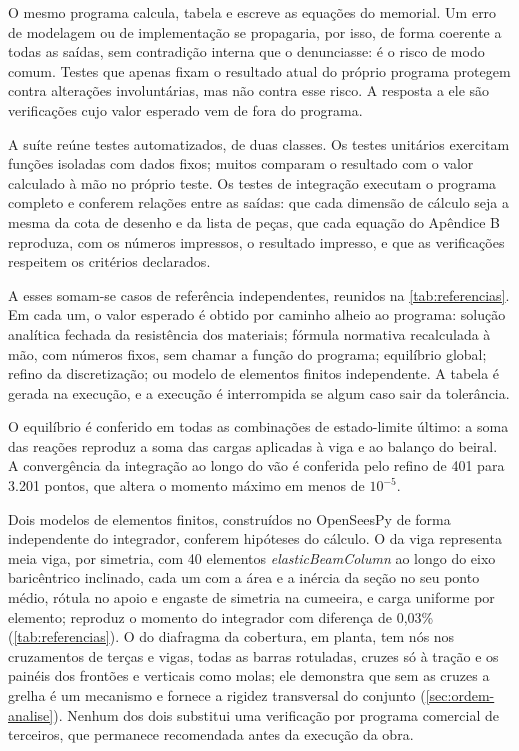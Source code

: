 O mesmo programa calcula, tabela e escreve as equações do memorial. Um erro de
modelagem ou de implementação se propagaria, por isso, de forma coerente a todas
as saídas, sem contradição interna que o denunciasse: é o risco de modo comum.
Testes que apenas fixam o resultado atual do próprio programa protegem contra
alterações involuntárias, mas não contra esse risco. A resposta a ele são
verificações cujo valor esperado vem de fora do programa.

A suíte reúne \nTestes{} testes automatizados, de duas classes. Os
\nTestesUnitarios{} testes unitários exercitam funções isoladas com dados
fixos; muitos comparam o resultado com o valor calculado à mão no próprio teste. Os
\nTestesIntegracao{} testes de integração executam o programa completo e
conferem relações entre as saídas: que cada dimensão de cálculo seja a mesma da
cota de desenho e da lista de peças, que cada equação do Apêndice B reproduza,
com os números impressos, o resultado impresso, e que as verificações respeitem
os critérios declarados.

A esses somam-se \nCasosReferencia{} casos de referência independentes,
reunidos na \autoref{tab:referencias}. Em cada um, o valor esperado é obtido por
caminho alheio ao programa: solução analítica fechada da resistência dos
materiais; fórmula normativa recalculada à mão, com números fixos, sem chamar a
função do programa; equilíbrio global; refino da discretização; ou modelo de
elementos finitos independente. A tabela é gerada na execução, e a execução é
interrompida se algum caso sair da tolerância.



O equilíbrio é conferido em todas as combinações de estado-limite último: a soma
das reações reproduz a soma das cargas aplicadas à viga e ao balanço do beiral. A
convergência da integração ao longo do vão é conferida pelo refino de 401 para
3.201 pontos, que altera o momento máximo em menos de $10^{-5}$.

Dois modelos de elementos finitos, construídos no OpenSeesPy de forma
independente do integrador, conferem hipóteses do cálculo. O da viga representa
meia viga, por simetria, com 40 elementos \textit{elasticBeamColumn} ao longo do
eixo baricêntrico inclinado, cada um com a área e a inércia da seção no seu ponto
médio, rótula no apoio e engaste de simetria na cumeeira, e carga uniforme por
elemento; reproduz o momento do integrador com diferença de 0,03\%
(\autoref{tab:referencias}). O do diafragma da cobertura, em planta, tem nós nos
cruzamentos de terças e vigas, todas as barras rotuladas, cruzes só à tração e os
painéis dos frontões e verticais como molas; ele demonstra que sem as cruzes a
grelha é um mecanismo e fornece a rigidez transversal do conjunto
(\autoref{sec:ordem-analise}). Nenhum dos dois substitui uma verificação por
programa comercial de terceiros, que permanece recomendada antes da execução da
obra.

